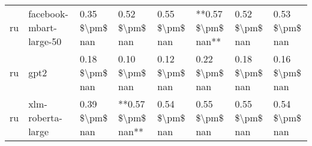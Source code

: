 \begin{tabular}{llllllll}
      ru &            facebook-mbart-large-50 & 0.35 \$\textbackslash pm\$ nan &            0.52 \$\textbackslash pm\$ nan &        0.55 \$\textbackslash pm\$ nan &     **0.57 \$\textbackslash pm\$ nan** &                          0.52 \$\textbackslash pm\$ nan &     0.53 \$\textbackslash pm\$ nan \\
      ru &                               gpt2 & 0.18 \$\textbackslash pm\$ nan &            0.10 \$\textbackslash pm\$ nan &        0.12 \$\textbackslash pm\$ nan &         0.22 \$\textbackslash pm\$ nan &                          0.18 \$\textbackslash pm\$ nan &     0.16 \$\textbackslash pm\$ nan \\
      ru &                  xlm-roberta-large & 0.39 \$\textbackslash pm\$ nan &        **0.57 \$\textbackslash pm\$ nan** &        0.54 \$\textbackslash pm\$ nan &         0.55 \$\textbackslash pm\$ nan &                          0.55 \$\textbackslash pm\$ nan &     0.54 \$\textbackslash pm\$ nan \\
\bottomrule
\end{tabular}
